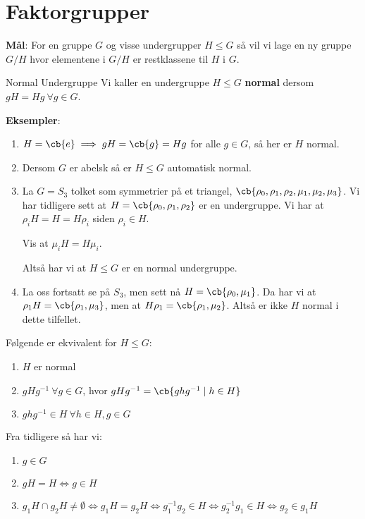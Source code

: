 \section{Faktorgrupper}

\textbf{Mål}: For en gruppe $G$ og visse undergrupper $H\leq G$ så vil vi lage en ny gruppe
$G/H$ hvor elementene i $G/H$ er restklassene til $H$ i $G$.

\begin{definition}{Normal Undergruppe}{}
	Vi kaller en undergruppe $H\leq G$ \textbf{normal} dersom $gH=Hg\ \forall g\in G$.
\end{definition}

\textbf{Eksempler}:
\begin{enumerate}
	\item $H=\cb{e}\implies gH=\cb{g}=Hg$ for alle $g\in G$, så her er $H$ normal.
	\item Dersom $G$ er abelsk så er $H\leq G$ automatisk normal.
	\item La $G=S_3$ tolket som symmetrier på et triangel,
	      $\cb{\rho_0, \rho_1, \rho_2, \mu_1, \mu_2, \mu_3}$. Vi har tidligere sett at
	      $H=\cb{\rho_0, \rho_1, \rho_2}$ er en undergruppe. Vi har at $\rho_i H=H=H\rho_i$ siden
	      $\rho_i\in H$.

	      Vis at $\mu_i H=H\mu_i$.

	      Altså har vi at $H\leq G$ er en normal undergruppe.

	\item La oss fortsatt se på $S_3$, men sett nå $H=\cb{\rho_0, \mu_1}$. Da har vi at
	      $\rho_1 H=\cb{\rho_1, \mu_3}$, men at $H\rho_1 =\cb{\rho_1, \mu_2}$. Altså er ikke $H$
	      normal i dette tilfellet.
\end{enumerate}

\begin{theorem*}{14.12}{}
	Følgende er ekvivalent for $H\leq G$:
	\begin{enumerate}
		\item $H$ er normal
		\item $gHg^{-1}\ \forall g\in G$, hvor $gHg^{-1}=\cb{ghg^{-1}\mid h\in H}$
		\item $ghg^{-1}\in H\ \forall h\in H, g\in G$
	\end{enumerate}
\end{theorem*}

Fra tidligere så har vi:
\begin{enumerate}
	\item $g\in G$
	\item $gH=H\iff g\in H$
	\item $g_1H\cap g_2H\neq\emptyset\iff g_1H=g_2H\iff g_1^{-1}g_2\in H\iff g_2^{-1}g_1\in H\iff g_2\in g_1 H$
\end{enumerate}

